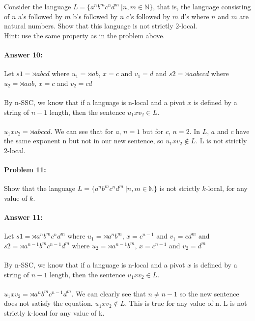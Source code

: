 \documentclass[10pt]{article}
\begin{document}
Consider the language
$L= \{a^n b^m c^n d^m\ | n, m \in \mathbb{N} \}$, that is, the
language consisting of $n$ a's followed by $m$ b's followed by $n$ c's
followed by $m$ d's where $n$ and $m$ are
natural numbers. Show that this language is not strictly $2$-local.\\

\noindent Hint: use the same property as in the problem above.

\paragraph{Answer 10:} 
Let $s1 = \rtimes abcd$ where $u_1 = \rtimes ab$, $x = c$ and $v_1 = d$
and $s2 = \rtimes aabccd$ where $u_2 = \rtimes aab$, $x = c$ and $v_2 = cd$
\\
\\
By n-SSC, we know that if a language is n-local and a pivot $x$ is defined by a string of $n-1$ length, then the sentence $u_1 x v_2 \in L$.
\\
\\
$u_1 x v_2 = \rtimes abccd$. We can see that for $a$, $n = 1$ but for $c$, $n = 2$. In $L$, $a$ and $c$ have the same exponent n but not in our new sentence, so $u_1 x v_2 \notin L$. L is not strictly 2-local.

\hrulefill
\paragraph{Problem 11:}

Show that the language $L= \{a^n b^m c^n d^m\ | n, m \in \mathbb{N} \}$ is not
strictly $k$-local, for any value of $k$.

\paragraph{Answer 11:} 
Let $s1 = \rtimes a^n b^m c^n d^m$ where $u_1 = \rtimes a^n b^m$, $x = c^{n-1}$ and $v_1 = cd^m$
and $s2 = \rtimes a^{n-1} b^m c^{n-1} d^m$ where $u_2 = \rtimes a^{n-1} b^m$, $x = c^{n-1}$ and $v_2 = d^m$
\\
\\
By n-SSC, we know that if a language is n-local and a pivot $x$ is defined by a string of $n-1$ length, then the sentence $u_1 x v_2 \in L$.
\\
\\
$u_1 x v_2 = \rtimes a^n b^m c^{n-1} d^m$. We can clearly see that $n \neq n-1$ so the new sentence does not satisfy the equation. $u_1 x v_2 \notin L$. This is true for any value of n. L is not strictly k-local for any value of k.
\end{document}
